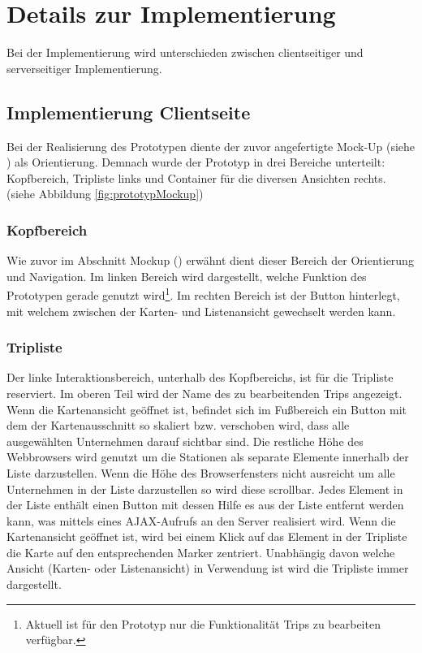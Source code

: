 \documentclass[Bachelorarbeit.tex]{subfiles}
\begin{document}
\section{Details zur Implementierung}
\label{chap:implementierung:sec:details}
Bei der Implementierung wird unterschieden zwischen clientseitiger und serverseitiger Implementierung.

\subsection{Implementierung Clientseite}
Bei der Realisierung des Prototypen diente der zuvor angefertigte Mock-Up (siehe ) als Orientierung. 
Demnach wurde der Prototyp in drei Bereiche unterteilt: Kopfbereich, Tripliste links und Container für die diversen Ansichten rechts. (siehe Abbildung \ref{fig:prototypMockup})


\subsubsection*{Kopfbereich}
Wie zuvor im Abschnitt Mockup () erwähnt dient dieser Bereich der Orientierung und Navigation.
Im linken Bereich wird dargestellt, welche Funktion des Prototypen gerade genutzt wird\footnote{Aktuell ist für den Prototyp nur die Funktionalität Trips zu bearbeiten verfügbar.}.
Im rechten Bereich ist der Button hinterlegt, mit welchem zwischen der Karten- und Listenansicht gewechselt werden kann.

\subsubsection*{Tripliste}
Der linke Interaktionsbereich, unterhalb des Kopfbereichs, ist für die Tripliste reserviert.
Im oberen Teil wird der Name des zu bearbeitenden Trips angezeigt.
Wenn die Kartenansicht geöffnet ist, befindet sich im Fußbereich ein Button mit dem der Kartenausschnitt so skaliert bzw. verschoben wird, dass alle ausgewählten Unternehmen darauf sichtbar sind.
Die restliche Höhe des Webbrowsers wird genutzt um die Stationen als separate Elemente innerhalb der Liste darzustellen.
Wenn die Höhe des Browserfensters nicht ausreicht um alle Unternehmen in der Liste darzustellen so wird diese scrollbar.
Jedes Element in der Liste enthält einen Button mit dessen Hilfe es aus der Liste entfernt werden kann, was mittels eines \ac{AJAX}-Aufrufs an den Server realisiert wird. 
Wenn die Kartenansicht geöffnet ist, wird bei einem Klick auf das Element in der Tripliste die Karte auf den entsprechenden Marker zentriert.
Unabhängig davon welche Ansicht (Karten- oder Listenansicht) in Verwendung ist wird die Tripliste immer dargestellt.
\end{document}
